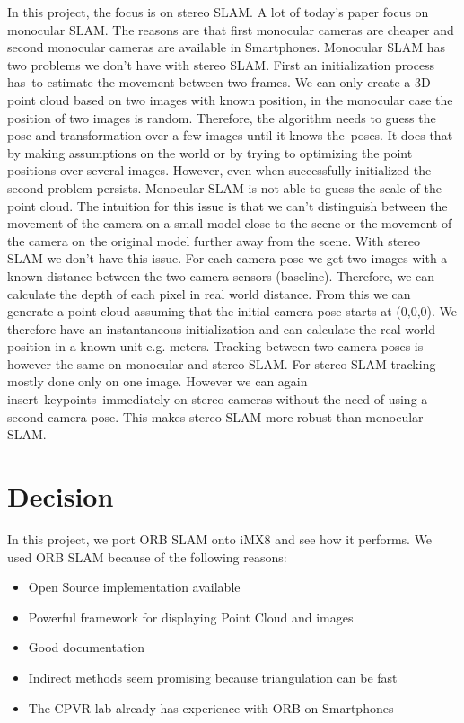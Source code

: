 \documentclass[11pt,a4paper,titlepage,oneside]{report}
\begin{document}
In this project, the focus is on stereo SLAM. A lot of today's paper focus on monocular SLAM. The reasons are that first monocular cameras are cheaper and second monocular cameras are available in Smartphones. Monocular SLAM has two problems we don’t have with stereo SLAM. First an initialization process has to estimate the movement between two frames. We can only create a 3D point cloud based on two images with known position, in the monocular case the position of two images is random. Therefore, the algorithm needs to guess the pose and transformation over a few images until it knows the poses. It does that by making assumptions on the world or by trying to optimizing the point positions over several images. However, even when successfully initialized the second problem persists. Monocular SLAM is not able to guess the scale of the point cloud. The intuition for this issue is that we can’t distinguish between the movement of the camera on a small model close to the scene or the movement of the camera on the original model further away from the scene. With stereo SLAM we don’t have this issue. For each camera pose we get two images with a known distance between the two camera sensors (baseline). Therefore, we can calculate the depth of each pixel in real world distance. From this we can generate a point cloud assuming that the initial camera pose starts at (0,0,0). We therefore have an instantaneous initialization and can calculate the real world position in a known unit e.g. meters. Tracking between two camera poses is however the same on monocular and stereo SLAM. For stereo SLAM tracking mostly done only on one image. However we can again insert keypoints immediately on stereo cameras without the need of using a second camera pose. This makes stereo SLAM more robust than monocular SLAM.

\section{Decision}

In this project, we port ORB SLAM onto iMX8 and see how it performs. We used ORB SLAM because of the following reasons:
\begin{itemize}
	\item Open Source implementation available
	\item Powerful framework for displaying Point Cloud and images
	\item Good documentation
	\item Indirect methods seem promising because triangulation can be fast
	\item The CPVR lab already has experience with ORB on Smartphones
\end{itemize}
\end{document}
